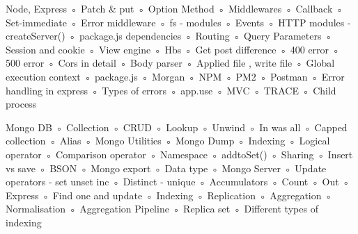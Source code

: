 Node, Express
 ◦ Patch & put
 ◦ Option Method
 ◦ Middlewares
 ◦ Callback
 ◦ Set-immediate
 ◦ Error middleware
 ◦ fs - modules
 ◦ Events
 ◦ HTTP modules - createServer()
 ◦ package.js dependencies
 ◦ Routing
 ◦ Query Parameters
 ◦ Session and cookie
 ◦ View engine
 ◦ Hbs
 ◦ Get post difference
 ◦ 400 error
 ◦ 500 error
 ◦ Cors in detail
 ◦ Body parser
 ◦ Applied file , write file
 ◦ Global execution context
 ◦ package.js
 ◦ Morgan
 ◦ NPM
 ◦ PM2
 ◦ Postman
 ◦ Error handling in express
 ◦ Types of errors
 ◦ app.use
 ◦ MVC
 ◦ TRACE
 ◦ Child process

Mongo DB
 ◦ Collection
 ◦ CRUD
 ◦ Lookup
 ◦ Unwind
 ◦ In was all
 ◦ Capped collection
 ◦ Alias
 ◦ Mongo Utilities
 ◦ Mongo Dump
 ◦ Indexing
 ◦ Logical operator
 ◦ Comparison operator
 ◦ Namespace
 ◦ addtoSet()
 ◦ Sharing
 ◦ Insert vs save
 ◦ BSON
 ◦ Mongo export
 ◦ Data type
 ◦ Mongo Server
 ◦ Update operators - set unset inc
 ◦ Distinct - unique
 ◦ Accumulators
 ◦ Count
 ◦ Out
 ◦ Express
 ◦ Find one and update
 ◦ Indexing
 ◦ Replication
 ◦ Aggregation
 ◦ Normalisation
 ◦ Aggregation Pipeline
 ◦ Replica set
 ◦ Different types of indexing


